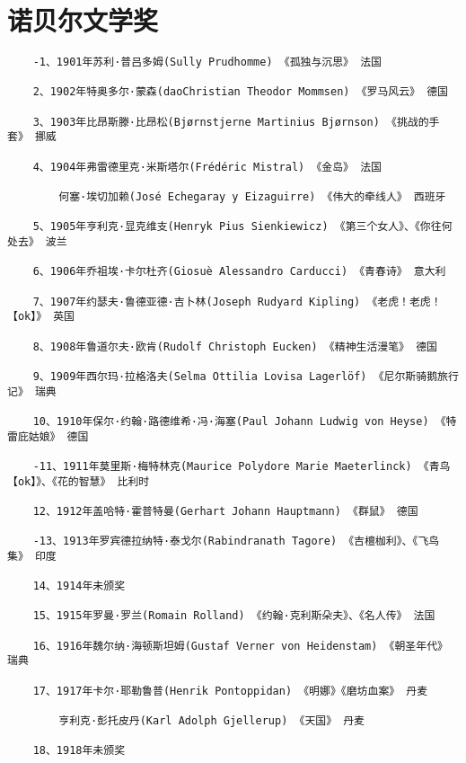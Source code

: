 \documentclass[UTF8]{../../RepresentationUniverse}
\begin{document}
\section{诺贝尔文学奖}

\begin{lstlisting}
    -1、1901年苏利·普吕多姆(Sully Prudhomme) 《孤独与沉思》 法国

    2、1902年特奥多尔·蒙森(daoChristian Theodor Mommsen) 《罗马风云》 德国
    
    3、1903年比昂斯滕·比昂松(Bjørnstjerne Martinius Bjørnson) 《挑战的手套》 挪威
    
    4、1904年弗雷德里克·米斯塔尔(Frédéric Mistral) 《金岛》 法国
    
        何塞·埃切加赖(José Echegaray y Eizaguirre) 《伟大的牵线人》 西班牙
    
    5、1905年亨利克·显克维支(Henryk Pius Sienkiewicz) 《第三个女人》、《你往何处去》 波兰
    
    6、1906年乔祖埃·卡尔杜齐(Giosuè Alessandro Carducci) 《青春诗》 意大利
    
    7、1907年约瑟夫·鲁德亚德·吉卜林(Joseph Rudyard Kipling) 《老虎！老虎！【ok】》 英国
    
    8、1908年鲁道尔夫·欧肯(Rudolf Christoph Eucken) 《精神生活漫笔》 德国
    
    9、1909年西尔玛·拉格洛夫(Selma Ottilia Lovisa Lagerlöf) 《尼尔斯骑鹅旅行记》 瑞典
    
    10、1910年保尔·约翰·路德维希·冯·海塞(Paul Johann Ludwig von Heyse) 《特雷庇姑娘》 德国
    
    -11、1911年莫里斯·梅特林克(Maurice Polydore Marie Maeterlinck) 《青鸟【ok】》、《花的智慧》 比利时
    
    12、1912年盖哈特·霍普特曼(Gerhart Johann Hauptmann) 《群鼠》 德国
    
    -13、1913年罗宾德拉纳特·泰戈尔(Rabindranath Tagore) 《吉檀枷利》、《飞鸟集》 印度
    
    14、1914年未颁奖
    
    15、1915年罗曼·罗兰(Romain Rolland) 《约翰·克利斯朵夫》、《名人传》 法国
    
    16、1916年魏尔纳·海顿斯坦姆(Gustaf Verner von Heidenstam) 《朝圣年代》 瑞典
    
    17、1917年卡尔·耶勒鲁普(Henrik Pontoppidan) 《明娜》《磨坊血案》 丹麦
    
        亨利克·彭托皮丹(Karl Adolph Gjellerup) 《天国》 丹麦
    
    18、1918年未颁奖
    

\end{lstlisting}
\end{document}
